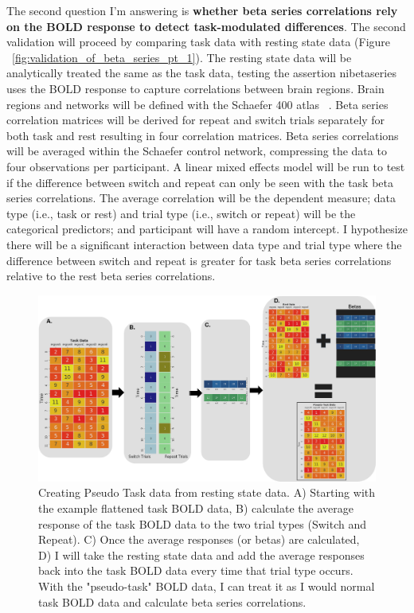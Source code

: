 \documentclass[phd,appendix,figures]{uithesis}
\begin{document}
The second question I'm answering is \textbf{whether beta series correlations rely on the BOLD response to detect task-modulated differences}. 
The second validation will proceed by comparing task data with resting state data (Figure ~\ref{fig:validation_of_beta_series_pt_1}).
The resting state data will be analytically treated the same as the task data, testing the assertion nibetaseries uses the BOLD response to capture correlations between brain regions.
Brain regions and networks will be defined with the Schaefer 400 atlas ~\citep{schaefer2017}.
Beta series correlation matrices will be derived for repeat and switch trials separately for both task and rest resulting in four correlation matrices.
Beta series correlations will be averaged within the Schaefer control network, compressing the data to four observations per participant.
A linear mixed effects model will be run to test if the difference between switch and repeat can only be seen with the task beta series correlations.
The average correlation will be the dependent measure; data type (i.e., task or rest) and trial type (i.e., switch or repeat) will be the categorical predictors; and participant will have a random intercept.
I hypothesize there will be a significant interaction between data type and trial type where the difference between switch and repeat is greater for task beta series correlations relative to the rest beta series correlations.

\begin{figure}[H]%
	\centering
	\includegraphics[width=1\linewidth]{validation_of_beta_series_pt_2}
	\caption{Creating Pseudo Task data from resting state data.
	A) Starting with the example flattened task BOLD data, B) calculate the average response of the task BOLD data
	to the two trial types (Switch and Repeat).
	C) Once the average responses (or betas) are calculated,
	D) I will take the resting state data and add the average responses back into the task BOLD data
	every time that trial type occurs.
	With the "pseudo-task" BOLD data, I can treat it as I would normal task BOLD data and calculate beta series
	correlations.
	}
	\label{fig:validation_of_beta_series_pt_2}
\end{figure}
\end{document}
